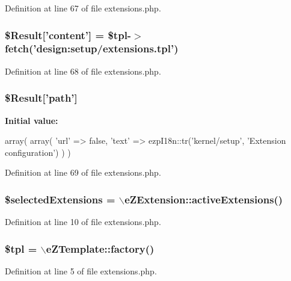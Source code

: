 Definition at line 67 of file extensions.\-php.

\hypertarget{extensions_8php_a0d32c70e3cf8c7b3fe5e4a499e9cd58f}{
\subsubsection[{\$\-Result}]{\setlength{\rightskip}{0pt plus 5cm}\$Result\mbox{[}'content'\mbox{]} = \$tpl-\/$>$fetch('design\-:setup/extensions.\-tpl')}}\label{extensions_8php_a0d32c70e3cf8c7b3fe5e4a499e9cd58f}


Definition at line 68 of file extensions.\-php.

\hypertarget{extensions_8php_a94a2cc5784adee982dec0235638f6251}{
\subsubsection[{\$\-Result}]{\setlength{\rightskip}{0pt plus 5cm}\$Result\mbox{[}'path'\mbox{]}}}\label{extensions_8php_a94a2cc5784adee982dec0235638f6251}
{\bfseries Initial value\-:}
\begin{DoxyCode}
 array(
                        array(
                            'url' => false,
                            'text' => ezpI18n::tr('kernel/setup', 'Extension
       configuration')
                        )
                )
\end{DoxyCode}


Definition at line 69 of file extensions.\-php.

\hypertarget{extensions_8php_adb784a735925c0ca3b600a1e0b1df50e}{
\subsubsection[{\$selected\-Extensions}]{\setlength{\rightskip}{0pt plus 5cm}\$selected\-Extensions = $\backslash$e\-Z\-Extension\-::active\-Extensions()}}\label{extensions_8php_adb784a735925c0ca3b600a1e0b1df50e}


Definition at line 10 of file extensions.\-php.

\hypertarget{extensions_8php_a04b1944cdb09f9a4e290cde7a12499e6}{
\subsubsection[{\$tpl}]{\setlength{\rightskip}{0pt plus 5cm}\$tpl = $\backslash$e\-Z\-Template\-::factory()}}\label{extensions_8php_a04b1944cdb09f9a4e290cde7a12499e6}


Definition at line 5 of file extensions.\-php.

